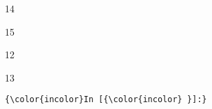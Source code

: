 \documentclass[11pt]{article}
\begin{document}
    
    \begin{enumerate*}
\item 14
\item 15
\end{enumerate*}


    
    \begin{enumerate*}
\item 12
\item 13
\end{enumerate*}


    
    \begin{Verbatim}[commandchars=\\\{\}]
{\color{incolor}In [{\color{incolor} }]:} 
\end{Verbatim}
\end{document}
